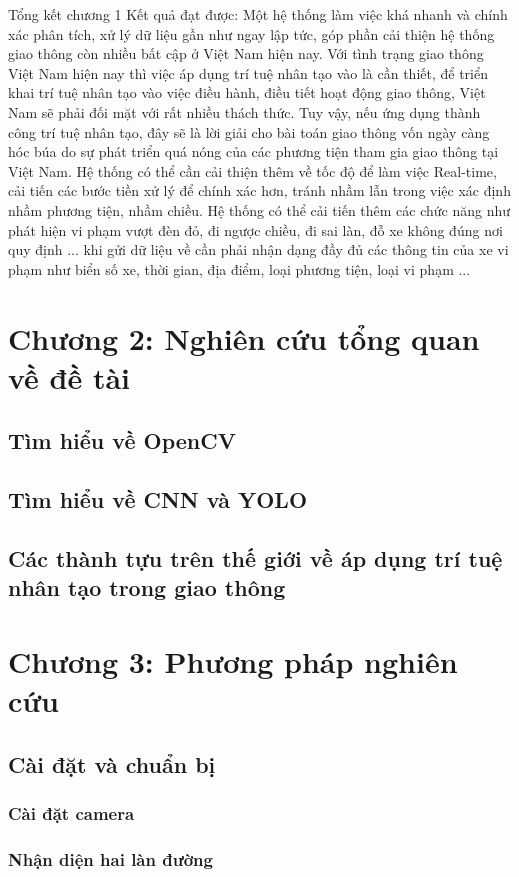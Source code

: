 \documentclass[14pt,oneside,a4paper]{extreport}
\begin{document}
Tổng kết chương 1 Kết quả đạt được: Một hệ thống làm việc khá nhanh và chính xác phân tích, xử lý dữ liệu gần như ngay lập tức, góp phần cải thiện hệ thống giao thông còn nhiều bất cập ở Việt Nam hiện nay.
Với tình trạng giao thông Việt Nam hiện nay thì việc áp dụng trí tuệ nhân tạo vào là cần thiết, để triển khai trí tuệ nhân tạo vào việc điều hành, điều tiết hoạt động giao thông, Việt Nam sẽ phải đối mặt với rất nhiều thách thức. Tuy vậy, nếu ứng dụng thành công trí tuệ nhân tạo, đây sẽ là lời giải cho bài toán giao thông vốn ngày càng hóc búa do sự phát triển quá nóng của các phương tiện tham gia giao thông tại Việt Nam.
Hệ thống có thể cần cải thiện thêm về tốc độ để làm việc Real-time, cải tiến các bước tiền xử lý để chính xác hơn, tránh nhầm lẫn trong việc xác định nhầm phương tiện, nhầm chiều. Hệ thống có thể cải tiến thêm các chức năng như phát hiện vi phạm vượt đèn đỏ, đi ngược chiều, đi sai làn, đỗ xe không đúng nơi quy định ... khi gửi dữ liệu về cần phải nhận dạng đầy đủ các thông tin của xe vi phạm như biển số xe, thời gian, địa điểm, loại phương tiện, loại vi phạm ...

\section{Chương 2: Nghiên cứu tổng quan về đề tài}
\subsection{Tìm hiểu về OpenCV}
\subsection{Tìm hiểu về CNN và YOLO}
\subsection{Các thành tựu trên thế giới về áp dụng trí tuệ nhân tạo trong giao thông}
\section{Chương 3: Phương pháp nghiên cứu}
\subsection{Cài đặt và chuẩn bị}
\subsubsection{Cài đặt camera}
\subsubsection{Nhận diện hai làn đường}
\end{document}
